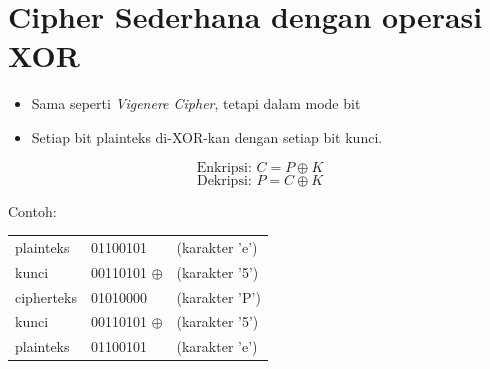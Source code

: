 \documentclass{article}
\begin{document}

\section*{Cipher Sederhana dengan operasi XOR}

\begin{itemize}
    \item Sama seperti \textit{Vigenere Cipher}, tetapi dalam mode bit
    \item Setiap bit plainteks di-XOR-kan dengan setiap bit kunci.
\end{itemize}

\[ \text{Enkripsi: } C = P \oplus K \]
\[ \text{Dekripsi: } P = C \oplus K \]

\vspace{5mm}

Contoh:
\begin{tabular}{lll}
plainteks & 01100101 & (karakter 'e') \\
kunci & 00110101 $\oplus$ & (karakter '5') \\
\hline
cipherteks & 01010000 & (karakter 'P') \\
kunci & 00110101 $\oplus$ & (karakter '5') \\
\hline
plainteks & 01100101 & (karakter 'e')
\end{tabular}
\end{document}
